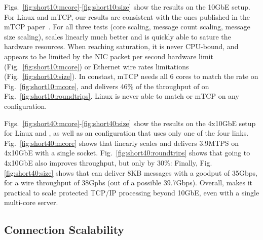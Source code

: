 
 Figs.~\ref{fig:short10:mcore}-\ref{fig:short10:size} show the results
on the 10GbE setup.  For Linux and mTCP, our results are consistent
with the ones published in the mTCP paper~\cite{jeong2014mtcp}.  For
all three tests (core scaling, message count scaling, message size
scaling), \ix scales linearly much better and is quickly able to
sature the hardware resources.  When reaching saturation, it is never
CPU-bound, and appears to be limited by the NIC packet per second
hardware limit (Fig.~\ref{fig:short10:mcore}) or Ethernet wire rates
limitations (Fig.~\ref{fig:short10:size}).  In constast, mTCP needs
all 6 cores to match the rate on Fig.~\ref{fig:short10:mcore}, and
delivers 46\% of the throughput of \ix on
Fig.~\ref{fig:short10:roundtrips}.  Linux is never able to match \ix
or mTCP on any configuration.





Figs.~\ref{fig:short40:mcore}-\ref{fig:short40:size} show the results
on the 4x10GbE setup for Linux and \ix, as well as an \ix
configuration that uses only one of the four
links. Fig.~\ref{fig:short40:mcore} shows that \ix linearly scales and
delivers 3.9MTPS on 4x10GbE with a single socket.
Fig.~\ref{fig:short40:roundtrips} shows that going to 4x10GbE also
improves throughput, but only by 30\%: 
Finally,
Fig.\ref{fig:short40:size} shows that \ix can deliver 8KB messages
with a goodput of 35Gbps, for a wire throughput of 38Gpbs (out of a
possible 39.7Gbps).  Overall, \ix makes it practical to scale
protected TCP/IP processing beyond 10GbE, even with a single
multi-core server.


\subsection{Connection Scalability}

